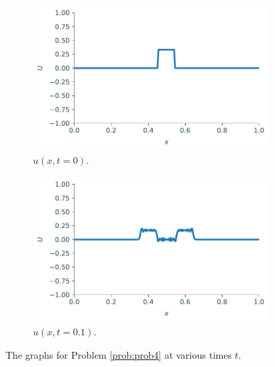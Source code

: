 \begin{problem}
\begin{figure}[H]
\centering
\begin{subfigure}{.49\textwidth}
\centering
\includegraphics[width=\linewidth]{figures/prob4.pdf}
\caption{$u(x,t=0)$.}
\end{subfigure}
%
\begin{subfigure}{.49\textwidth}
\centering
\includegraphics[width=\linewidth]{figures/prob4_t1.pdf}
\caption{$u(x,t = 0.1)$.}
\end{subfigure}
\caption{The graphs for Problem \ref{prob:prob4} at various times $t$.}
\label{fig:prob4}
\end{figure}
\end{problem}

